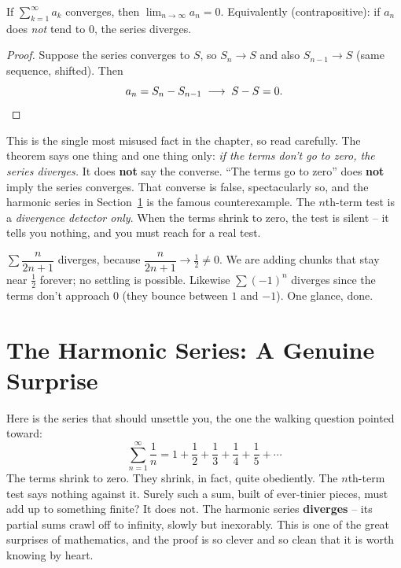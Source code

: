 \begin{theorem}
\label{ch29:thm-nth-term}
If $\sum_{k=1}^{\infty} a_k$ converges, then $\lim_{n\to\infty} a_n = 0$. Equivalently (contrapositive): if $a_n$ does \emph{not} tend to $0$, the series diverges.
\end{theorem}

\begin{proof}
Suppose the series converges to $S$, so $S_n \to S$ and also $S_{n-1} \to S$ (same sequence, shifted). Then
\[
a_n = S_n - S_{n-1} \;\longrightarrow\; S - S = 0. \qedhere
\]
\end{proof}

\begin{trapbox}
This is the single most misused fact in the chapter, so read carefully. The theorem says one thing and one thing only: \emph{if the terms don't go to zero, the series diverges.} It does \textbf{not} say the converse. ``The terms go to zero'' does \textbf{not} imply the series converges. That converse is false, spectacularly so, and the harmonic series in Section~\ref{ch29:harmonic} is the famous counterexample. The $n$th-term test is a \emph{divergence detector only}. When the terms shrink to zero, the test is silent -- it tells you nothing, and you must reach for a real test.
\end{trapbox}

\begin{example}
$\sum \dfrac{n}{2n+1}$ diverges, because $\dfrac{n}{2n+1}\to \tfrac12 \neq 0$. We are adding chunks that stay near $\tfrac12$ forever; no settling is possible. Likewise $\sum (-1)^n$ diverges since the terms don't approach $0$ (they bounce between $1$ and $-1$). One glance, done.
\end{example}

\section{The Harmonic Series: A Genuine Surprise}
\label{ch29:harmonic}

Here is the series that should unsettle you, the one the walking question pointed toward:
\[
\sum_{n=1}^{\infty} \frac{1}{n} = 1 + \frac{1}{2} + \frac{1}{3} + \frac{1}{4} + \frac{1}{5} + \cdots
\]
The terms shrink to zero. They shrink, in fact, quite obediently. The $n$th-term test says nothing against it. Surely such a sum, built of ever-tinier pieces, must add up to something finite? It does not. The harmonic series \textbf{diverges} -- its partial sums crawl off to infinity, slowly but inexorably. This is one of the great surprises of mathematics, and the proof is so clever and so clean that it is worth knowing by heart.

